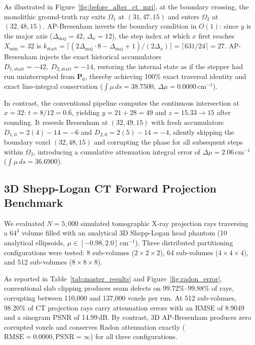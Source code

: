 \documentclass[conference]{IEEEtran}
\begin{document}
As illustrated in Figure~\ref{fig:before_after_ct_mri}, at the boundary crossing, the monolithic ground-truth ray exits $\Omega_1$ at $(31, 47, 15)$ and enters $\Omega_2$ at $(32, 48, 15)$. AP-Bresenham inverts the boundary condition in $O(1)$: since $y$ is the major axis ($\Delta_{\mathrm{maj}} = 42$, $\Delta_x = 12$), the step index at which $x$ first reaches $X_{\min}=32$ is $k_{\mathrm{start}} = \lceil (2\Delta_{\mathrm{maj}} \cdot 8 - \Delta_{\mathrm{maj}} + 1)/(2\Delta_x) \rceil = \lceil 631/24 \rceil = 27$. AP-Bresenham injects the exact historical accumulators $D_{1,\mathrm{start}} = -42,\; D_{2,\mathrm{start}} = -14$, restoring the internal state as if the stepper had run uninterrupted from $\mathbf{P}_0$, thereby achieving 100\% exact traversal identity and exact line-integral conservation ($\int \mu \,ds = 38.7500$, $\Delta \mu = 0.0000$\,cm$^{-1}$).

In contrast, the conventional pipeline computes the continuous intersection at $x = 32$: $t = 8/12 = 0.\overline{6}$, yielding $y = 21 + 28 = 49$ and $z = 15.33 \to 15$ after rounding. It reseeds Bresenham at $(32, 49, 15)$ with fresh accumulators $D_{1,0} = 2(4) - 14 = -6$ and $D_{2,0} = 2(5) - 14 = -4$, silently skipping the boundary voxel $(32, 48, 15)$ and corrupting the phase for all subsequent steps within $\Omega_2$, introducing a cumulative attenuation integral error of $\Delta \mu = 2.06$\,cm$^{-1}$ ($\int \mu \,ds = 36.6900$).

\subsection{3D Shepp-Logan CT Forward Projection Benchmark}
We evaluated $N = 5,000$ simulated tomographic X-ray projection rays traversing a $64^3$ volume filled with an analytical 3D Shepp-Logan head phantom (10 analytical ellipsoids, $\mu \in [-0.98, 2.0]$\,cm$^{-1}$). Three distributed partitioning configurations were tested: 8 sub-volumes ($2 \times 2 \times 2$), 64 sub-volumes ($4 \times 4 \times 4$), and 512 sub-volumes ($8 \times 8 \times 8$).

As reported in Table~\ref{tab:master_results} and Figure~\ref{fig:radon_error}, conventional slab clipping produces seam defects on 99.72\%--99.88\% of rays, corrupting between 110,000 and 137,000 voxels per run. At 512 sub-volumes, 98.20\% of CT projection rays carry attenuation errors with an RMSE of 8.9049 and a sinogram PSNR of 14.99\,dB. By contrast, 3D AP-Bresenham produces zero corrupted voxels and conserves Radon attenuation exactly ($\mathrm{RMSE} = 0.0000, \mathrm{PSNR} = \infty$) for all three configurations.
\end{document}
